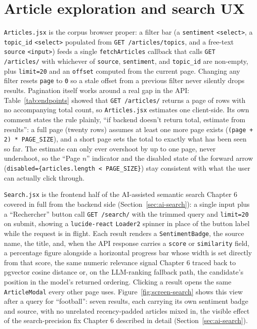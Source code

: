 \section{Article exploration and search UX}
\label{sec:exploration-search}
\begin{sloppypar}
\texttt{Articles.jsx} is the corpus browser proper: a filter bar (a \texttt{sentiment} \texttt{<select>}, a \texttt{topic\_id} \texttt{<select>} populated from \texttt{GET /articles/\allowbreak topics}, and a free-text \texttt{source} \texttt{<input>}) feeds a single \texttt{fetchArticles} callback that calls \texttt{GET /articles/} with whichever of \texttt{source}, \texttt{sentiment}, and \texttt{topic\_id} are non-empty, plus \texttt{limit=20} and an \texttt{offset} computed from the current page. Changing any filter resets \texttt{page} to \texttt{0} so a stale offset from a previous filter never silently drops results. Pagination itself works around a real gap in the API: Table~\ref{tab:endpoints} showed that \texttt{GET /articles/} returns a page of rows with no accompanying total count, so \texttt{Articles.jsx} estimates one client-side. Its own comment states the rule plainly, ``if backend doesn't return total, estimate from results'': a full page (twenty rows) assumes at least one more page exists (\texttt{(page + 2) * PAGE\_SIZE}), and a short page sets the total to exactly what has been seen so far. The estimate can only ever overshoot by up to one page, never undershoot, so the ``Page \(n\)'' indicator and the disabled state of the forward arrow (\texttt{disabled=\{articles.length < PAGE\_SIZE\}}) stay consistent with what the user can actually click through.
\end{sloppypar}

\begin{sloppypar}
\texttt{Search.jsx} is the frontend half of the AI-assisted semantic search Chapter 6 covered in full from the backend side (Section~\ref{sec:ai-search}): a single input plus a ``Rechercher'' button call \texttt{GET /search/} with the trimmed query and \texttt{limit=20} on submit, showing a \texttt{lucide-react} \texttt{Loader2} spinner in place of the button label while the request is in flight. Each result renders a \texttt{SentimentBadge}, the source name, the title, and, when the API response carries a \texttt{score} or \texttt{similarity} field, a percentage figure alongside a horizontal progress bar whose width is set directly from that score, the same numeric relevance signal Chapter 6 traced back to pgvector cosine distance or, on the LLM-ranking fallback path, the candidate's position in the model's returned ordering. Clicking a result opens the same \texttt{ArticleModal} every other page uses. Figure~\ref{fig:screen-search} shows this view after a query for ``football'': seven results, each carrying its own sentiment badge and source, with no unrelated recency-padded articles mixed in, the visible effect of the search-precision fix Chapter 6 described in detail (Section~\ref{sec:ai-search}).
\end{sloppypar}

